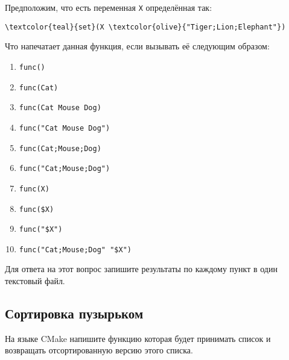 \documentclass{article}
\begin{document}
Предположим, что есть переменная \texttt{X} определённая так:
\begin{Verbatim}[commandchars=\\\{\}]
\textcolor{teal}{set}(X \textcolor{olive}{"Tiger;Lion;Elephant"})
\end{Verbatim}
Что напечатает данная функция, если вызывать её следующим образом:

\begin{enumerate}
\item \texttt{func()}
\item \texttt{func(Cat)}
\item \texttt{func(Cat Mouse Dog)}
\item \texttt{func("Cat Mouse Dog")}
\item \texttt{func(Cat;Mouse;Dog)}
\item \texttt{func("Cat;Mouse;Dog")}
\item \texttt{func(X)}
\item \texttt{func(\${X})}
\item \texttt{func("\${X}")}
\item \texttt{func("Cat;Mouse;Dog" {} "\${X}")}
\end{enumerate}

Для ответа на этот вопрос запишите результаты по каждому пункт в один текстовый файл.


\subsection{Сортировка пузырьком}
На языке CMake напишите функцию которая будет принимать список и возвращать отсортированную версию этого списка.
\end{document}
